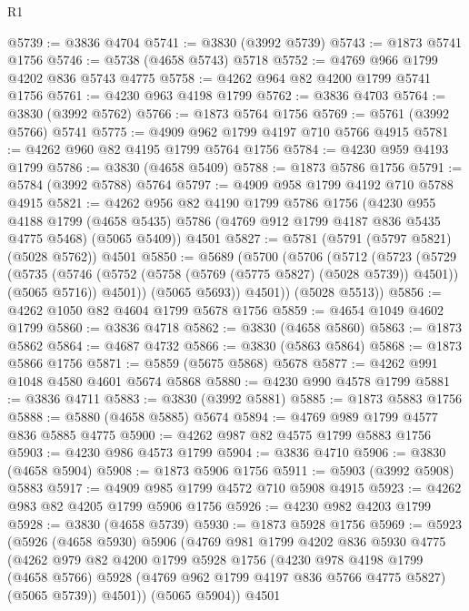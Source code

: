 \begin{lexlean}{R1}
\begin{coremodule}
@5739 := @3836 @4704
@5741 := @3830 (@3992 @5739)
@5743 := @1873 @5741 @1756
@5746 := @5738 (@4658 @5743) @5718
@5752 := @4769 @966 @1799 @4202 @836 @5743 @4775
@5758 := @4262 @964 @82 @4200 @1799 @5741 @1756
@5761 := @4230 @963 @4198 @1799
@5762 := @3836 @4703
@5764 := @3830 (@3992 @5762)
@5766 := @1873 @5764 @1756
@5769 := @5761 (@3992 @5766) @5741
@5775 := @4909 @962 @1799 @4197 @710 @5766 @4915
@5781 := @4262 @960 @82 @4195 @1799 @5764 @1756
@5784 := @4230 @959 @4193 @1799
@5786 := @3830 (@4658 @5409)
@5788 := @1873 @5786 @1756
@5791 := @5784 (@3992 @5788) @5764
@5797 := @4909 @958 @1799 @4192 @710 @5788 @4915
@5821 := @4262
    @956
    @82
    @4190
    @1799
    @5786
    @1756
    (@4230
      @955
      @4188
      @1799
      (@4658 @5435)
      @5786
      (@4769 @912 @1799 @4187 @836 @5435 @4775 @5468)
      (@5065 @5409))
    @4501
@5827 := @5781 (@5791 (@5797 @5821) (@5028 @5762)) @4501
@5850 := @5689
    (@5700
      (@5706
        (@5712
          (@5723
            (@5729
              (@5735
                (@5746 (@5752 (@5758 (@5769 (@5775 @5827) (@5028 @5739)) @4501)) (@5065 @5716))
                @4501))
            (@5065 @5693))
          @4501))
      (@5028 @5513))
@5856 := @4262 @1050 @82 @4604 @1799 @5678 @1756
@5859 := @4654 @1049 @4602 @1799
@5860 := @3836 @4718
@5862 := @3830 (@4658 @5860)
@5863 := @1873 @5862
@5864 := @4687 @4732
@5866 := @3830 (@5863 @5864)
@5868 := @1873 @5866 @1756
@5871 := @5859 (@5675 @5868) @5678
@5877 := @4262 @991 @1048 @4580 @4601 @5674 @5868
@5880 := @4230 @990 @4578 @1799
@5881 := @3836 @4711
@5883 := @3830 (@3992 @5881)
@5885 := @1873 @5883 @1756
@5888 := @5880 (@4658 @5885) @5674
@5894 := @4769 @989 @1799 @4577 @836 @5885 @4775
@5900 := @4262 @987 @82 @4575 @1799 @5883 @1756
@5903 := @4230 @986 @4573 @1799
@5904 := @3836 @4710
@5906 := @3830 (@4658 @5904)
@5908 := @1873 @5906 @1756
@5911 := @5903 (@3992 @5908) @5883
@5917 := @4909 @985 @1799 @4572 @710 @5908 @4915
@5923 := @4262 @983 @82 @4205 @1799 @5906 @1756
@5926 := @4230 @982 @4203 @1799
@5928 := @3830 (@4658 @5739)
@5930 := @1873 @5928 @1756
@5969 := @5923
    (@5926
      (@4658 @5930)
      @5906
      (@4769
        @981
        @1799
        @4202
        @836
        @5930
        @4775
        (@4262
          @979
          @82
          @4200
          @1799
          @5928
          @1756
          (@4230
            @978
            @4198
            @1799
            (@4658 @5766)
            @5928
            (@4769 @962 @1799 @4197 @836 @5766 @4775 @5827)
            (@5065 @5739))
          @4501))
      (@5065 @5904))
    @4501

\end{coremodule}
\end{lexlean}
